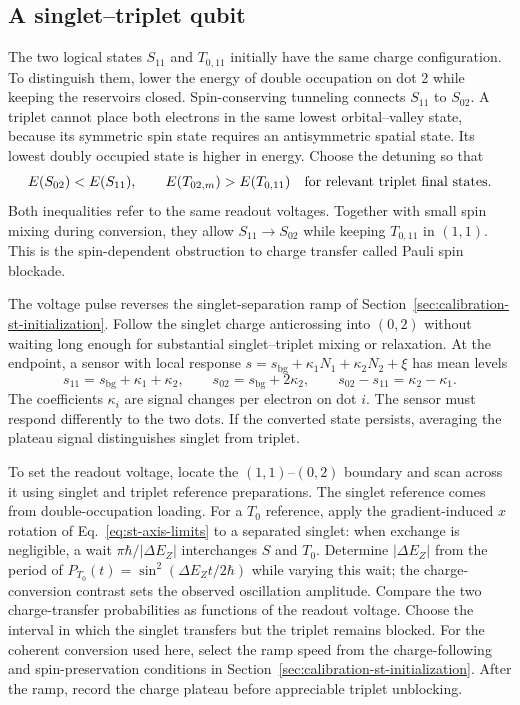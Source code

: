 \subsection{A singlet--triplet qubit}
\label{sec:calibration-st-readout}

The two logical states $S_{11}$ and $T_{0,11}$ initially have the
same charge configuration. To distinguish them, lower the energy
of double occupation on dot 2 while keeping the reservoirs closed.
Spin-conserving tunneling connects $S_{11}$ to $S_{02}$. A triplet
cannot place both electrons in the same lowest orbital--valley
state, because its symmetric spin state requires an antisymmetric
spatial state. Its lowest doubly occupied state is higher in
energy. Choose the detuning so that
\begin{equation}
 E(S_{02})<E(S_{11}),\qquad
 E(T_{02,m})>E(T_{0,11})
 \quad\hbox{for relevant triplet final states}.
 \label{eq:calibration-pair-readout-window}
\end{equation}
Both inequalities refer to the same readout voltages. Together
with small spin mixing during conversion, they allow
$S_{11}\to S_{02}$ while keeping $T_{0,11}$ in $(1,1)$.
This is the spin-dependent obstruction to charge transfer called
Pauli spin blockade.

The voltage pulse reverses the singlet-separation ramp of
Section~\ref{sec:calibration-st-initialization}. Follow the
singlet charge anticrossing into $(0,2)$ without waiting long
enough for substantial singlet--triplet mixing or relaxation.
At the endpoint, a sensor with local response
$s=s_{\mathrm{bg}}+\kappa_1N_1+\kappa_2N_2+\xi$
has mean levels
\[
 s_{11}=s_{\mathrm{bg}}+\kappa_1+\kappa_2,\qquad
 s_{02}=s_{\mathrm{bg}}+2\kappa_2,\qquad
 s_{02}-s_{11}=\kappa_2-\kappa_1.
\]
The coefficients $\kappa_i$ are signal changes per electron on
dot $i$. The sensor must respond differently to the two dots.
If the converted state persists, averaging the plateau signal
distinguishes singlet from triplet.

To set the readout voltage, locate the $(1,1)$--$(0,2)$ boundary
and scan across it using singlet and triplet reference preparations.
The singlet reference comes from double-occupation loading.
For a $T_0$ reference, apply the gradient-induced $x$ rotation of
Eq.~\eqref{eq:st-axis-limits} to a separated singlet: when exchange
is negligible, a wait $\pi\hbar/|\Delta E_Z|$ interchanges $S$ and
$T_0$. Determine $|\Delta E_Z|$ from the period of
$P_{T_0}(t)=\sin^2(\Delta E_Zt/2\hbar)$ while varying this wait;
the charge-conversion contrast sets the observed oscillation amplitude.
Compare the two charge-transfer probabilities as functions of the
readout voltage. Choose the interval in which the singlet transfers
but the triplet remains blocked. For the coherent conversion used
here, select the ramp speed from
the charge-following and spin-preservation conditions in
Section~\ref{sec:calibration-st-initialization}. After the ramp,
record the charge plateau before appreciable triplet unblocking.

